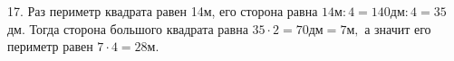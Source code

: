 17. Раз периметр квадрата равен 14м, его сторона равна $14\text{м}:4=140\text{дм}:4=35$дм. Тогда сторона большого квадрата равна $35\cdot2=70\text{дм}=7\text{м},$ а значит его периметр равен $7\cdot4=28$м.\\

